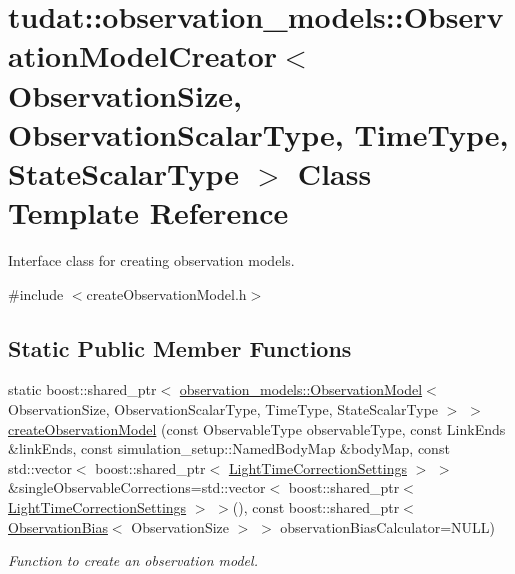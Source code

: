 \hypertarget{classtudat_1_1observation__models_1_1ObservationModelCreator}{}\section{tudat\+:\+:observation\+\_\+models\+:\+:Observation\+Model\+Creator$<$ Observation\+Size, Observation\+Scalar\+Type, Time\+Type, State\+Scalar\+Type $>$ Class Template Reference}
\label{classtudat_1_1observation__models_1_1ObservationModelCreator}


Interface class for creating observation models.  




{\ttfamily \#include $<$create\+Observation\+Model.\+h$>$}

\subsection*{Static Public Member Functions}
\begin{DoxyCompactItemize}
\item 
static boost\+::shared\+\_\+ptr$<$ \hyperlink{classtudat_1_1observation__models_1_1ObservationModel}{observation\+\_\+models\+::\+Observation\+Model}$<$ Observation\+Size, Observation\+Scalar\+Type, Time\+Type, State\+Scalar\+Type $>$ $>$ \hyperlink{classtudat_1_1observation__models_1_1ObservationModelCreator_a633776bdbcc3f4a20594695bf25c9045}{create\+Observation\+Model} (const Observable\+Type observable\+Type, const Link\+Ends \&link\+Ends, const simulation\+\_\+setup\+::\+Named\+Body\+Map \&body\+Map, const std\+::vector$<$ boost\+::shared\+\_\+ptr$<$ \hyperlink{classtudat_1_1observation__models_1_1LightTimeCorrectionSettings}{Light\+Time\+Correction\+Settings} $>$ $>$ \&single\+Observable\+Corrections=std\+::vector$<$ boost\+::shared\+\_\+ptr$<$ \hyperlink{classtudat_1_1observation__models_1_1LightTimeCorrectionSettings}{Light\+Time\+Correction\+Settings} $>$ $>$(), const boost\+::shared\+\_\+ptr$<$ \hyperlink{classtudat_1_1observation__models_1_1ObservationBias}{Observation\+Bias}$<$ Observation\+Size $>$ $>$ observation\+Bias\+Calculator=N\+U\+LL)
\begin{DoxyCompactList}\small\item\em Function to create an observation model. \end{DoxyCompactList}\end{DoxyCompactItemize}


